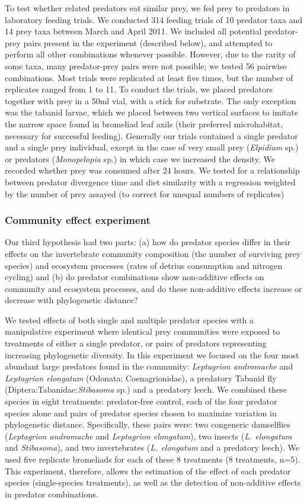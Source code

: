 \documentclass[11pt]{article}
\begin{document}
To test whether related predators eat similar prey, we fed prey to
predators in laboratory feeding trials. We conducted 314 feeding trials
of 10 predator taxa and 14 prey taxa between March and April 2011. We
included all potential predator-prey pairs present in the experiment
(described below), and attempted to perform all other combinations
whenever possible. However, due to the rarity of some taxa, many
predator-prey pairs were not possible; we tested 56 pairwise
combinations. Most trials were replicated at least five times, but the
number of replicates ranged from 1 to 11. To conduct the trials, we
placed predators together with prey in a 50ml vial, with a stick for
substrate. The only exception was the tabanid larvae, which we placed
between two vertical surfaces to imitate the narrow space found in
bromeliad leaf axils (their preferred microhabitat, necessary for
successful feeding). Generally our trials contained a single predator
and a single prey individual, except in the case of very small prey
(\emph{Elpidium} sp.) or predators (\emph{Monopelopia} sp.) in which
case we increased the density. We recorded whether prey was consumed
after 24 hours. We tested for a relationship between predator divergence time and diet similarity with a regression weighted by the number of prey assayed (to correct for unequal numbers of replicates)

\subsubsection*{Community effect experiment}

Our third hypothesis had two parts: (a) how do predator species differ
in their effects on the invertebrate community composition (the number of surviving prey species) and ecosystem processes (rates of detrius consumption and nitrogen cycling)
and (b) do predator combinations show non-additive effects on community
and ecosystem processes, and do these non-additive effects increase or
decrease with phylogenetic distance?

We tested effects of both single and multiple predator species with a manipulative experiment where identical prey
communities were exposed to treatments of either a single predator, or
pairs of predators representing increasing phylogenetic diversity. In
this experiment we focused on the four most abundant large predators
found in the community: \emph{Leptagrion andromache} and
\emph{Leptagrion elongatum} (Odonata: Coenagrionidae), a predatory
Tabanid fly (Diptera:Tabanidae:\emph{Stibasoma} sp.) and a predatory
leech. We combined these species in eight treatments: predator-free
control, each of the four predator species alone and
pairs of predator species chosen to maximize variation in phylogenetic
distance. Specifically, these pairs were: two congeneric
damselflies (\emph{Leptagrion andromache} and \emph{Leptagrion
elongatum}), two insects (\emph{L. elongatum} and \emph{Stibasoma}), and
two invertebrates (\emph{L. elongatum} and a predatory leech). We used
five replicate bromeliads for each of these 8 treatments (8 treatments,
n=5). This experiment, therefore, allows the estimation of the effect of
each predator species (single-species treatments), as well as the
detection of non-additive effects in predator combinations.
\end{document}
